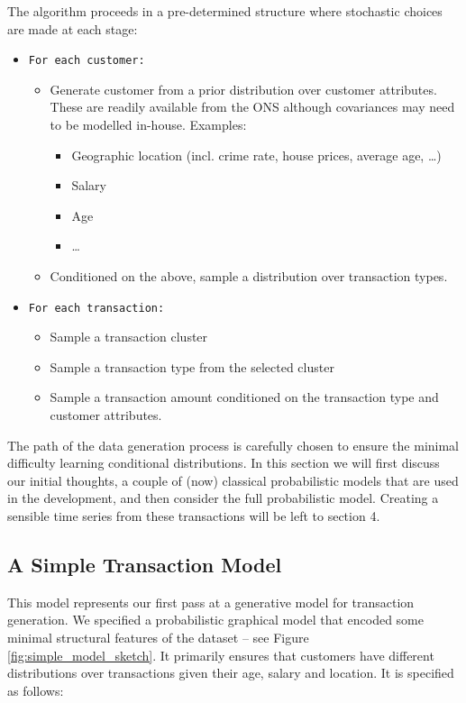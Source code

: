 \documentclass[]{article}
\begin{document}
The algorithm proceeds in a pre-determined structure where stochastic
choices are made at each stage: 
\begin{itemize}
    \tightlist
    \item \texttt{For\ each\ customer:}
    \begin{itemize}
    \tightlist
    \item Generate customer from a prior distribution over customer attributes.
These are readily available from the ONS although covariances may need
to be modelled in-house. Examples:
    \begin{itemize}
        \tightlist
        \item Geographic location (incl. crime rate, house prices, average age, \ldots{})
        \item Salary
        \item Age
        \item \ldots
    \end{itemize}
    \item Conditioned on the above, sample a distribution over transaction types.
    \end{itemize}
    \item \texttt{For\ each\ transaction:}
    \begin{itemize}
        \tightlist
        \item Sample a transaction cluster
        \item Sample a transaction type from the selected cluster
        \item Sample a transaction amount conditioned on the transaction type and customer
attributes.
    \end{itemize}
\end{itemize}

The path of the data generation process is carefully chosen to ensure the
minimal difficulty learning conditional distributions. In this section
we will first discuss our initial thoughts, a couple of (now) classical
probabilistic models that are used in the development, and then consider
the full probabilistic model. Creating a sensible time series from these
transactions will be left to section 4.

\subsection{A Simple Transaction Model}\label{a-simple-transaction-model}

This model represents our first pass at a generative model for
transaction generation. We specified a probabilistic graphical model
that encoded some minimal structural features of the dataset -- see
Figure \ref{fig:simple_model_sketch}. It primarily ensures that customers have different
distributions over transactions given their age, salary and location. It
is specified as follows:
\end{document}
